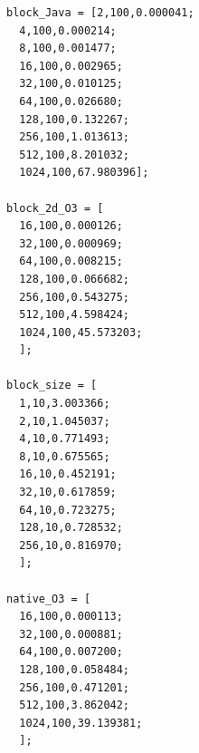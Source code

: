 \documentclass{article}
\begin{document}
\begin{verbatim}
block_Java = [2,100,0.000041;
  4,100,0.000214;
  8,100,0.001477;
  16,100,0.002965;
  32,100,0.010125;
  64,100,0.026680;
  128,100,0.132267;
  256,100,1.013613;
  512,100,8.201032;
  1024,100,67.980396];

block_2d_O3 = [
  16,100,0.000126;
  32,100,0.000969;
  64,100,0.008215;
  128,100,0.066682;
  256,100,0.543275;
  512,100,4.598424;
  1024,100,45.573203;
  ];

block_size = [
  1,10,3.003366;
  2,10,1.045037;
  4,10,0.771493;
  8,10,0.675565;
  16,10,0.452191;
  32,10,0.617859;
  64,10,0.723275;
  128,10,0.728532;
  256,10,0.816970;
  ];

native_O3 = [
  16,100,0.000113;
  32,100,0.000881;
  64,100,0.007200;
  128,100,0.058484;
  256,100,0.471201;
  512,100,3.862042;
  1024,100,39.139381;
  ];
\end{verbatim}
\end{document}
